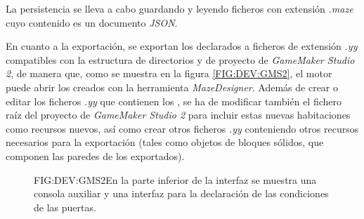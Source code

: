 La persistencia se lleva a cabo guardando y leyendo ficheros con extensión \textit{.maze} cuyo contenido es un documento \textit{JSON}.

En cuanto a la exportación, se exportan los  declarados a ficheros de extensión \textit{.yy} compatibles con la estructura de directorios y de proyecto de \textit{GameMaker Studio 2}, de manera que, como se muestra en la figura \ref{FIG:DEV:GMS2}, el motor puede abrir los  creados con la herramienta \textit{MazeDesigner}. Además de crear o editar los ficheros \textit{.yy} que contienen los , se ha de modificar también el fichero raíz del proyecto de \textit{GameMaker Studio 2} para incluir estas nuevas habitaciones como recursos nuevos, así como crear otros ficheros \textit{.yy} conteniendo otros recursos necesarios para la exportación (tales como objetos de bloques sólidos, que componen las paredes de los  exportados).

\begin{figure}{FIG:DEV:GMS2}{En la parte inferior de la interfaz se muestra una consola auxiliar y una interfaz para la declaración de las condiciones de las puertas.}
	 \quad
\end{figure}

